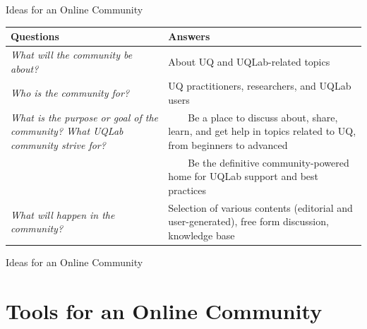 \documentclass[]{rsuqbeamernew}
\newcommand{\tabitem}{~~\llap{\textbullet}~~}
\begin{document}
\begin{frame}[t]{Ideas for an Online Community}

\begin{tabularx}{\textwidth}{XX}
  \hline
  Questions                            & Answers \\
  \hline
  \emph{What will the community be about?}               & About UQ and UQLab-related topics \\
  \emph{Who is the community for?}                       & UQ practitioners, researchers, and UQLab users \\
  
  \emph{What is the purpose or goal of the community? What UQLab community strive for?}
  & \tabitem Be a place to discuss about, share, learn, and get help in topics related to UQ, from beginners to advanced \\
  & \tabitem Be the definitive community-powered home for UQLab support and best practices \\
  
  \emph{What will happen in the community?}          & Selection of various contents (editorial and user-generated), free form discussion, knowledge base \\
  

  \hline
\end{tabularx}

\end{frame}

\begin{frame}[t]{Ideas for an Online Community}

\end{frame}

\section{Tools for an Online Community}
\end{document}
